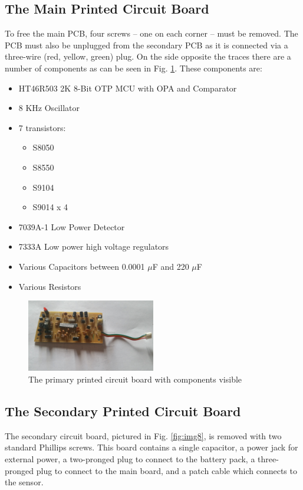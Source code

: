 \documentclass[journal]{IEEEtran}
\begin{document}
\subsection{The Main Printed Circuit Board}
To free the main PCB, four screws -- one on each corner -- must be removed. The PCB must also be unplugged from the 
secondary PCB as it is connected via a three-wire (red, yellow, green) plug. On the side opposite the traces there are a number 
of components as can be seen in Fig. \ref{fig:img6}. These components are:
\begin{itemize}
  \item{HT46R503 2K 8-Bit OTP MCU with OPA and Comparator \cite{holtek:holtek}}
  \item{8 KHz Oscillator}
  \item{7 transistors:}
  \begin{itemize}
    \item{S8050}
    \item{S8550}
    \item{S9104}
    \item{S9014 x 4}
  \end{itemize}  
 \item{7039A-1 Low Power Detector}
 \item{7333A Low power high voltage regulators}  
 \item{Various Capacitors between 0.0001 $\mu$F and 220 $\mu$F}
 \item {Various Resistors}
\end{itemize}

\begin{figure}[h]
  \includegraphics[width=0.5\textwidth]{img/img6.jpg}
  \caption{The primary printed circuit board with components visible}
  \label{fig:img6}
\end{figure}

\subsection{The Secondary Printed Circuit Board}
The secondary circuit board, pictured in Fig. \ref{fig:img8}, is removed with two standard Phillips screws. This board contains a single capacitor, a power jack for external power, a two-pronged plug to connect to the battery pack, a three-pronged 
plug to connect to the main board, and a patch cable which connects to the sensor. 
\end{document}
